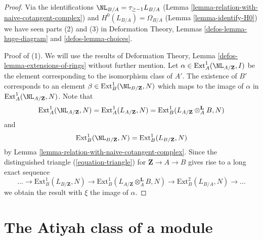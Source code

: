 \begin{proof}
Via the identifications $\NL_{B/A} = \tau_{\geq -1}L_{B/A}$
(Lemma \ref{lemma-relation-with-naive-cotangent-complex}) and
$H^0(L_{B/A}) = \Omega_{B/A}$
(Lemma \ref{lemma-identify-H0})
we have seen parts (2) and (3) in
Deformation Theory, Lemmas \ref{defos-lemma-huge-diagram} and
\ref{defos-lemma-choices}.

\medskip\noindent
Proof of (1). We will use the results of
Deformation Theory, Lemma \ref{defos-lemma-extensions-of-rings}
without further mention.
Let $\alpha \in \text{Ext}^1_A(\NL_{A/\mathbf{Z}}, I)$
be the element corresponding to the isomorphism class of $A'$.
The existence of $B'$ corresponds to an element
$\beta \in \text{Ext}_B^1(\NL_{B/\mathbf{Z}}, N)$
which maps to the image of $\alpha$ in
$\text{Ext}^1_A(\NL_{A/\mathbf{Z}}, N)$. Note that
$$
\text{Ext}^1_A(\NL_{A/\mathbf{Z}}, N) =
\text{Ext}^1_A(L_{A/\mathbf{Z}}, N) =
\text{Ext}^1_B(L_{A/\mathbf{Z}} \otimes_A^\mathbf{L} B, N)
$$
and
$$
\text{Ext}^1_B(\NL_{B/\mathbf{Z}}, N) =
\text{Ext}^1_B(L_{B/\mathbf{Z}}, N)
$$
by Lemma \ref{lemma-relation-with-naive-cotangent-complex}.
Since the distinguished triangle (\ref{equation-triangle})
for $\mathbf{Z} \to A \to B$ gives rise to a long exact sequence
$$
\ldots \to
\text{Ext}^1_B(L_{B/\mathbf{Z}}, N) \to
\text{Ext}^1_B(L_{A/\mathbf{Z}} \otimes_A^\mathbf{L} B, N) \to
\text{Ext}^2_B(L_{B/A}, N) \to \ldots
$$
we obtain the result with $\xi$ the image of $\alpha$.
\end{proof}





\section{The Atiyah class of a module}
\label{section-atiyah}

